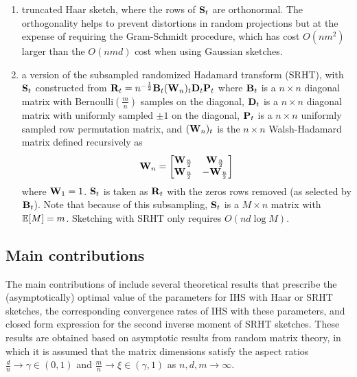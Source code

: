 \begin{enumerate}

\item
truncated Haar sketch, where the rows of $\mathbf{S}_t$ are orthonormal. The orthogonality helps to prevent distortions in random projections but at the expense of requiring the Gram-Schmidt procedure, which has cost $O(nm^2)$ larger than the $O(nmd)$ cost when using Gaussian sketches.

\item
a version of the subsampled randomized Hadamard transform (SRHT), with $\mathbf{S}_t$ constructed from $\mathbf{R}_t=n^{-\frac{1}{2}}\mathbf{B}_t(\mathbf{W}_n)_t\mathbf{D}_t\mathbf{P}_t$ where $\mathbf{B}_t$ is a $n\times n$ diagonal matrix with \iid Bernoulli$\left(\frac{m}{n}\right)$ samples on the diagonal, $\mathbf{D}_t$ is a $n\times n$ diagonal matrix with uniformly sampled $\pm1$ on the diagonal, $\mathbf{P}_t$ is a $n\times n$ uniformly sampled row permutation matrix, and $(\mathbf{W}_n)_t$ is the $n\times n$ Walsh-Hadamard matrix defined recursively as
\[
\mathbf{W}_n =
\begin{bmatrix}
\mathbf{W}_\frac{n}{2} & \mathbf{W}_\frac{n}{2} \\
\mathbf{W}_\frac{n}{2} & -\mathbf{W}_\frac{n}{2}
\end{bmatrix}
\]
where $\mathbf{W}_1=1$. $\mathbf{S}_t$ is taken as $\mathbf{R}_t$ with the zeros rows removed (as selected by $\mathbf{B}_t$). Note that because of this subsampling, $\mathbf{S}_t$ is a $M\times n$ matrix with $\mathbb{E}[M]=m$. Sketching with SRHT only requires $O(nd\log M)$.

\end{enumerate}

\subsection{Main contributions}

The main contributions of \citet{Lacotte:2020} include several theoretical results that prescribe the (asymptotically) optimal value of the parameters for IHS with Haar or SRHT sketches, the corresponding convergence rates of IHS with these parameters, and closed form expression for the second inverse moment of SRHT sketches. These results are obtained based on asymptotic results from random matrix theory, in which it is assumed that the matrix dimensions satisfy the aspect ratios $\frac{d}{n}\rightarrow\gamma\in(0,1)$ and $\frac{m}{n}\rightarrow\xi\in(\gamma,1)$ as $n,d,m\rightarrow\infty$.
\\

